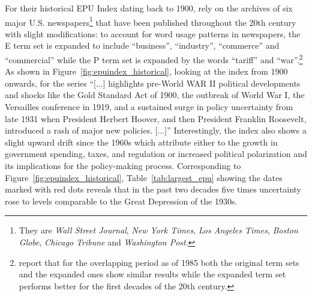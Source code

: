 \documentclass[a4paper,11pt,listof=nochaptergap,oneside,pointednumbers,bibtotoc,bigheadings,liststotoc]{scrbook}
\theoremstyle{mysatz}
\theoremstyle{mydefinition}
\theoremstyle{mybemerkung}
\begin{document}
For their historical EPU Index dating back to 1900, \citet{bakeretal:15} rely on the archives of six major U.S. newspapers\footnote{They are \textit{Wall Street Journal}, \textit{New York Times}, \textit{Los Angeles Times}, \textit{Boston Globe}, \textit{Chicago Tribune} and \textit{Washington Post}.} that have been published throughout the 20th century with slight modifications: to account for word usage patterns in newspapers, the E term set is expanded to include ``business'', ``industry'', ``commerce'' and ``commercial'' while the P term set is expanded by the words ``tariff'' and ``war''.\footnote{\citet{bakeretal:15} report that for the overlapping period as of 1985 both the original term sets and the expanded ones show similar results while the expanded term set performs better for the first decades of the 20th century.} As shown in Figure~\ref{fig:epuindex_historical}, looking at the index from 1900 onwards, for \citet[p. 1594]{bakeretal:15} the series ``[...] highlights pre-World WAR II political developments and shocks like the Gold Standard Act of 1900, the outbreak of World War I, the Versailles conference in 1919, and a sustained surge in policy uncertainty from late 1931 when President Herbert Hoover, and then President Franklin Roosevelt, introduced a rash of major new policies. [...]'' Interestingly, the index also shows a slight upward drift since the 1960s which \citet{bakeretal:14} attribute either to the growth in government spending, taxes, and regulation or increased political polarization and its implications for the policy-making process. Corresponding to Figure~\ref{fig:epuindex_historical}, Table~\ref{tab:largest_epu} showing the dates marked with red dots reveals that in the past two decades five times uncertainty rose to levels comparable to the Great Depression of the 1930s.




\begin{table}[!h]
\centering
\caption{7 Largest Spikes of U.S. EPU Historical}
\label{tab:largest_epu}
\centering
\end{table}
\end{document}
